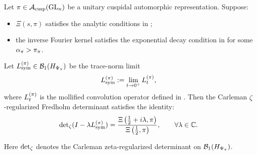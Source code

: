 \begin{theorem}
\label{thm:spectral_determinant_identity_Lpi}
Let \( \pi \in \mathcal{A}_{\mathrm{cusp}}(\mathrm{GL}_n) \) be a unitary cuspidal automorphic representation. Suppose:
\begin{itemize}
  \item \( \Xi(s, \pi) \) satisfies the analytic conditions in ;
  \item the inverse Fourier kernel satisfies the exponential decay condition in  for some \( \alpha_{\pi} > \pi_\pi \).
\end{itemize}

Let \( L_{\mathrm{sym}}^{(\pi)} \in \mathcal{B}_1(H_{\Psi_{\pi}}) \) be the trace-norm limit
\[
L_{\mathrm{sym}}^{(\pi)} := \lim_{t \to 0^+} L_t^{(\pi)},
\]
where \( L_t^{(\pi)} \) is the mollified convolution operator defined in . Then the Carleman \(\zeta\)-regularized Fredholm determinant satisfies the identity:
\[
\det\nolimits_{\zeta}(I - \lambda L_{\mathrm{sym}}^{(\pi)}) = \frac{\Xi\left(\tfrac{1}{2} + i\lambda, \pi\right)}{\Xi\left(\tfrac{1}{2}, \pi\right)},
\qquad \forall \lambda \in \mathbb{C}.
\]

Here \( \det\nolimits_{\zeta} \) denotes the Carleman zeta-regularized determinant on \( \mathcal{B}_1(H_{\Psi_{\pi}}) \).
\end{theorem}
